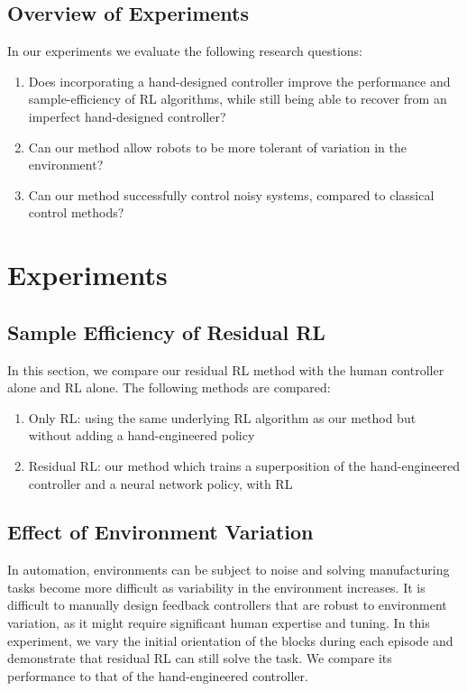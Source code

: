 \subsection{Overview of Experiments}
%
In our experiments we evaluate the following research questions:
\begin{enumerate}
    \item Does incorporating a hand-designed controller improve the performance and sample-efficiency of RL algorithms, while still being able to recover from an imperfect hand-designed controller?
    \item Can our method allow robots to be more tolerant of variation in the environment?
    \item Can our method successfully control noisy systems, compared to classical control methods?
\end{enumerate}

\section{Experiments}

\subsection{Sample Efficiency of Residual RL}
In this section, we compare our residual RL method with the human controller alone and RL alone. The following methods are compared:
\begin{enumerate}
    \item Only RL: using the same underlying RL algorithm as our method but without adding a hand-engineered policy
    \item Residual RL: our method which trains a superposition of the hand-engineered controller and a neural network policy, with RL
\end{enumerate}

\subsection{Effect of Environment Variation}
In automation, environments can be subject to noise and solving manufacturing tasks become more difficult as variability in the environment increases. 
It is difficult to manually design feedback controllers that are robust to environment variation, as it might require significant human expertise and tuning. In this experiment, we vary the initial orientation of the blocks during each episode and demonstrate that residual RL can still solve the task. We compare its performance to that of the hand-engineered controller.


